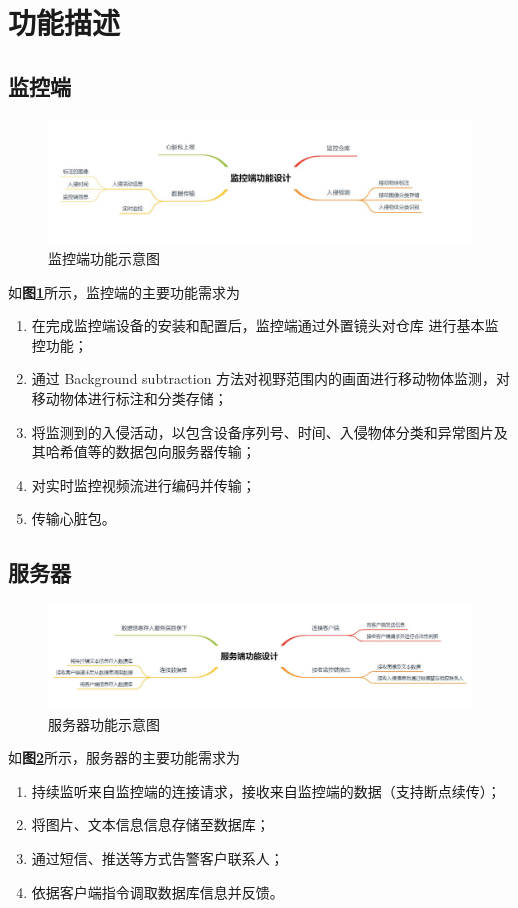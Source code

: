 \documentclass[article]{BJTU-thesis}
\begin{document}
	
\section{功能描述}
\subsection{监控端}
\begin{figure}[!htbp]
	\centering
	\includegraphics{img/2.jpg}
	\caption{监控端功能示意图}\label{fig:fig2}
\end{figure}

如\textbf{图\ref{fig:fig2}}所示，监控端的主要功能需求为
\begin{enumerate}
	\item 在完成监控端设备的安装和配置后，监控端通过外置镜头对仓库
	进行基本监控功能；
	\item 通过 Background subtraction 方法对视野范围内的画面进行移动物体监测，对移动物体进行标注和分类存储；
	\item 将监测到的入侵活动，以包含设备序列号、时间、入侵物体分类和异常图片及其哈希值等的数据包向服务器传输；
	\item 对实时监控视频流进行编码并传输；
	\item 传输心脏包。
\end{enumerate}

\subsection{服务器}
\begin{figure}[!htbp]
	\centering
	\includegraphics{img/3.jpg}
	\caption{服务器功能示意图}\label{fig:fig3}
\end{figure}
如\textbf{图\ref{fig:fig3}}所示，服务器的主要功能需求为
\newpage
\begin{enumerate}
	\item 持续监听来自监控端的连接请求，接收来自监控端的数据（支持断点续传）；
	\item 将图片、文本信息信息存储至数据库；
	\item 通过短信、推送等方式告警客户联系人；
	\item 依据客户端指令调取数据库信息并反馈。
	
\end{enumerate}
\end{document}
